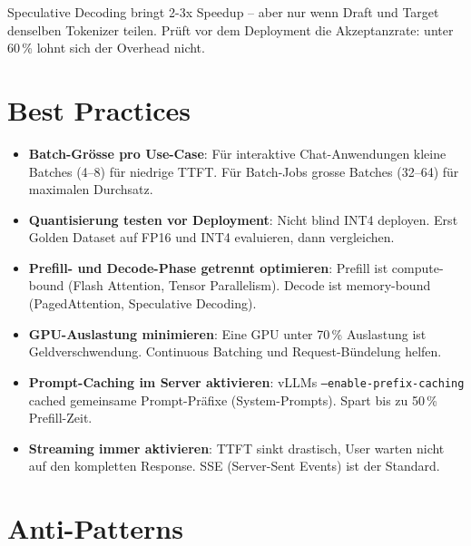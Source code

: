 \begin{praxishinweis}
Speculative Decoding bringt 2-3x Speedup -- aber nur wenn Draft und Target denselben Tokenizer teilen. Prüft vor dem Deployment die Akzeptanzrate: unter 60\,\% lohnt sich der Overhead nicht.
\end{praxishinweis}

\section{Best Practices}

\begin{itemize}[leftmargin=*]
    \item \textbf{Batch-Grösse pro Use-Case}: Für interaktive Chat-Anwendungen kleine Batches (4--8) für niedrige TTFT. Für Batch-Jobs grosse Batches (32--64) für maximalen Durchsatz.
    \item \textbf{Quantisierung testen vor Deployment}: Nicht blind INT4 deployen. Erst Golden Dataset auf FP16 und INT4 evaluieren, dann vergleichen.
    \item \textbf{Prefill- und Decode-Phase getrennt optimieren}: Prefill ist compute-bound (Flash Attention, Tensor Parallelism). Decode ist memory-bound (PagedAttention, Speculative Decoding).
    \item \textbf{GPU-Auslastung minimieren}: Eine GPU unter 70\,\% Auslastung ist Geldverschwendung. Continuous Batching und Request-Bündelung helfen.
    \item \textbf{Prompt-Caching im Server aktivieren}: vLLMs \texttt{--enable-prefix-caching} cached gemeinsame Prompt-Präfixe (System-Prompts). Spart bis zu 50\,\% Prefill-Zeit.
    \item \textbf{Streaming immer aktivieren}: TTFT sinkt drastisch, User warten nicht auf den kompletten Response. SSE (Server-Sent Events) ist der Standard.
\end{itemize}

\section{Anti-Patterns}

